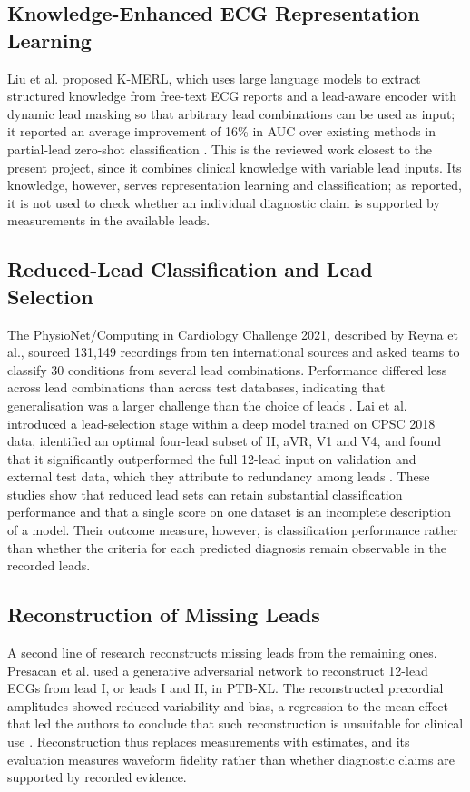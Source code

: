 \subsection*{Knowledge-Enhanced ECG Representation Learning}
Liu et al. proposed K-MERL, which uses large language models to extract structured knowledge from free-text ECG reports and a lead-aware encoder with dynamic lead masking so that arbitrary lead combinations can be used as input; it reported an average improvement of 16\% in AUC over existing methods in partial-lead zero-shot classification \cite{LIU2025ARBITRARY}. This is the reviewed work closest to the present project, since it combines clinical knowledge with variable lead inputs. Its knowledge, however, serves representation learning and classification; as reported, it is not used to check whether an individual diagnostic claim is supported by measurements in the available leads.

\subsection*{Reduced-Lead Classification and Lead Selection}
The PhysioNet/Computing in Cardiology Challenge 2021, described by Reyna et al., sourced 131,149 recordings from ten international sources and asked teams to classify 30 conditions from several lead combinations. Performance differed less across lead combinations than across test databases, indicating that generalisation was a larger challenge than the choice of leads \cite{REYNA2022ISSUES}. Lai et al. introduced a lead-selection stage within a deep model trained on CPSC 2018 data, identified an optimal four-lead subset of II, aVR, V1 and V4, and found that it significantly outperformed the full 12-lead input on validation and external test data, which they attribute to redundancy among leads \cite{LAI2021LEADSELECTION}. These studies show that reduced lead sets can retain substantial classification performance and that a single score on one dataset is an incomplete description of a model. Their outcome measure, however, is classification performance rather than whether the criteria for each predicted diagnosis remain observable in the recorded leads.

\subsection*{Reconstruction of Missing Leads}
A second line of research reconstructs missing leads from the remaining ones. Presacan et al. used a generative adversarial network to reconstruct 12-lead ECGs from lead I, or leads I and II, in PTB-XL. The reconstructed precordial amplitudes showed reduced variability and bias, a regression-to-the-mean effect that led the authors to conclude that such reconstruction is unsuitable for clinical use \cite{PRESACAN2025RECON}. Reconstruction thus replaces measurements with estimates, and its evaluation measures waveform fidelity rather than whether diagnostic claims are supported by recorded evidence.


